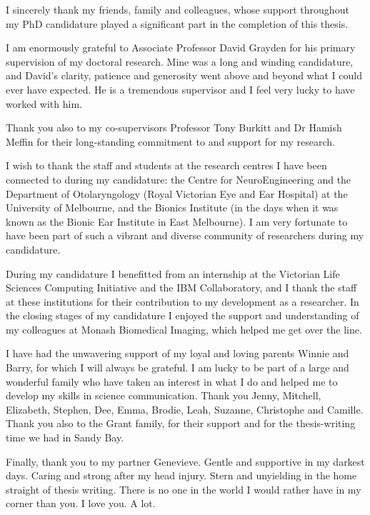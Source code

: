 
\begin{acknowledgements}

  I sincerely thank my friends, family and colleagues, whose support throughout
  my PhD candidature played a significant part in the completion of this thesis.

  I am enormously grateful to Associate Professor David Grayden for his primary
  supervision of my doctoral research. Mine was a long and winding candidature,
  and David’s clarity, patience and generosity went above and beyond what I
  could ever have expected. He is a tremendous supervisor and I feel very lucky
  to have worked with him.

  Thank you also to my co-supervisors Professor Tony Burkitt and Dr Hamish
  Meffin for their long-standing commitment to and support for my research.

  I wish to thank the staff and students at the research centres I have been
  connected to during my candidature: the Centre for NeuroEngineering and the
  Department of Otolaryngology (Royal Victorian Eye and Ear Hospital) at the
  University of Melbourne, and the Bionics Institute (in the days when it was
  known as the Bionic Ear Institute in East Melbourne). I am very fortunate to
  have been part of such a vibrant and diverse community of researchers during
  my candidature.

  During my candidature I benefitted from an internship at the Victorian Life
  Sciences Computing Initiative and the IBM Collaboratory, and I thank the staff
  at these institutions for their contribution to my development as a
  researcher. In the closing stages of my candidature I enjoyed the support and
  understanding of my colleagues at Monash Biomedical Imaging, which helped me
  get over the line.

  I have had the unwavering support of my loyal and loving parents Winnie and
  Barry, for which I will always be grateful. I am lucky to be part of a large
  and wonderful family who have taken an interest in what I do and helped me to
  develop my skills in science communication. Thank you Jenny, Mitchell,
  Elizabeth, Stephen, Dee, Emma, Brodie, Leah, Suzanne, Christophe and
  Camille. Thank you also to the Grant family, for their support and for the
  thesis-writing time we had in Sandy Bay.

  Finally, thank you to my partner Genevieve. Gentle and supportive in my
  darkest days. Caring and strong after my head injury. Stern and unyielding in
  the home straight of thesis writing. There is no one in the world I would
  rather have in my corner than you. I love you. A lot.

\end{acknowledgements}
